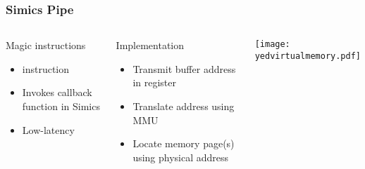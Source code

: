 \begin{frame}
\frametitle{Simics Pipe}

\begin{columns}

  \begin{block}{Magic instructions}
    \begin{itemize}
    \item {} instruction
    \item Invokes callback function in Simics
    \item Low-latency
    \end{itemize}
  \end{block}

  \begin{block}{Implementation}
    \begin{itemize}
    \item Transmit buffer address in register
    \item Translate address using MMU
    \item Locate memory page(s) using physical address
    \end{itemize}
  \end{block}
  
  \begin{center}
    \texttt{[image: yedvirtualmemory.pdf]}
  \end{center}
\end{columns}

\end{frame}
